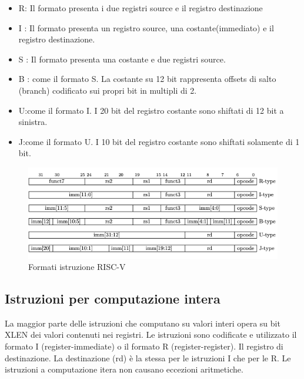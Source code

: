 \documentclass[12pt,a4paper]{report}
\begin{document}
\begin{itemize}
	\item R:  Il formato presenta i due registri source e il registro destinazione
	\item I : Il formato presenta un registro source, una costante(immediato) e il registro destinazione.
	\item S : Il formato presenta una costante e due registri source.
	\item B : come il formato S. La costante su 12 bit rappresenta offsets di salto (branch) codificato sui propri bit in multipli di 2.
	\item U:come il formato I. I 20 bit del registro costante sono shiftati di 12 bit a sinistra. 
	\item J:come  il formato U. I 10 bit del registro costante sono shiftati solamente di 1 bit. 
\end{itemize}

\begin{figure}
	\includegraphics[width = \textwidth]{FormatiIstruzione.png}
	\caption{Formati istruzione RISC-V}
	\label{Fig:Formati_istruzioni_RV32I}
\end{figure}


\subsection{Istruzioni per computazione intera}
La maggior parte delle istruzioni che computano su valori interi opera su bit XLEN dei valori contenuti nei registri. Le istruzioni sono codificate e utilizzato il formato I (register-immediate) o il formato R (register-register). Il registro di destinazione.  La destinazione (rd) è la stessa per le istruzioni I che per le R.  Le istruzioni a computazione itera non causano eccezioni aritmetiche.\\
\end{document}
